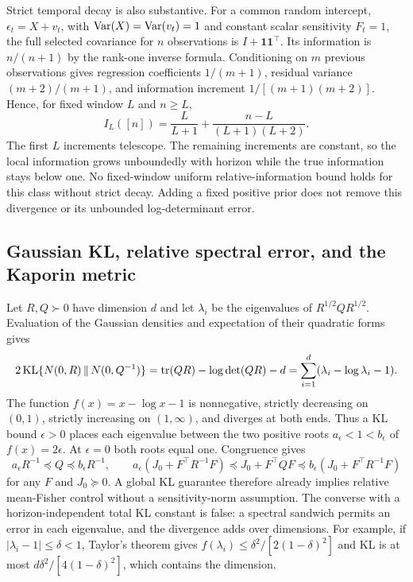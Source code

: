 Strict temporal decay is also substantive. For a common random intercept,
$\epsilon_t=X+v_t$, with $\operatorname{Var}(X)=\operatorname{Var}(v_t)=1$ and constant scalar
sensitivity $F_t=1$, the full selected covariance for $n$ observations is
$I+\boldsymbol1\boldsymbol1^\top$. Its information is $n/(n+1)$ by the
rank-one inverse formula. Conditioning on $m$ previous observations gives
regression coefficients $1/(m+1)$, residual variance $(m+2)/(m+1)$,
and information increment $1/[(m+1)(m+2)]$. Hence, for fixed window
$L$ and $n\ge L$,
\begin{equation}
 I_L([n])=\frac{L}{L+1}
              +\frac{n-L}{(L+1)(L+2)}.
 \label{eq:random-intercept-boundary}
\end{equation}
The first $L$ increments telescope. The remaining increments are constant,
so the local information grows unboundedly with horizon while the true
information stays below one. No fixed-window uniform relative-information
bound holds for this class without strict decay. Adding a fixed positive
prior does not remove this divergence or its unbounded log-determinant error.

\subsection{Gaussian KL, relative spectral error, and the Kaporin metric}
\label{app:locality-metrics}
Let $R,Q\succ0$ have dimension $d$ and let $\lambda_i$ be the eigenvalues
of $R^{1/2}QR^{1/2}$. Evaluation of the Gaussian densities and expectation
of their quadratic forms gives
\begin{equation}
 2\operatorname{KL}\{N(0,R)\,\|\,N(0,Q^{-1})\}
 =\operatorname{tr}(QR)-\log\det(QR)-d
 =\sum_{i=1}^d(\lambda_i-\log\lambda_i-1).
 \label{eq:kl-relative-identity}
\end{equation}
The function $f(x)=x-\log x-1$ is nonnegative, strictly decreasing on
$(0,1)$, strictly increasing on $(1,\infty)$, and diverges at both ends.
Thus a KL bound $\epsilon>0$ places each eigenvalue between the two
positive roots $a_\epsilon<1<b_\epsilon$ of $f(x)=2\epsilon$.
At $\epsilon=0$ both roots equal one. Congruence gives
\[
 a_\epsilon R^{-1}\preceq Q\preceq b_\epsilon R^{-1},\qquad
 a_\epsilon(J_0+F^\top R^{-1}F)
 \preceq J_0+F^\top QF
 \preceq b_\epsilon(J_0+F^\top R^{-1}F)
\]
for any $F$ and $J_0\succeq0$. A global KL guarantee therefore already
implies relative mean-Fisher control without a sensitivity-norm assumption.
The converse with a horizon-independent total KL constant is false:
a spectral sandwich permits an error in each eigenvalue, and the divergence
adds over dimensions. For example, if $|\lambda_i-1|\le\delta<1$,
Taylor's theorem gives $f(\lambda_i)\le\delta^2/[2(1-\delta)^2]$ and
KL is at most $d\delta^2/[4(1-\delta)^2]$, which contains the dimension.

